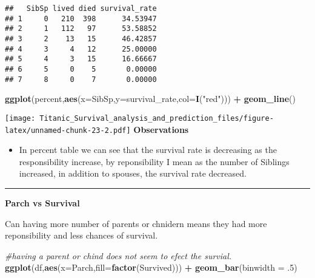 \documentclass[]{article}
\newenvironment{Shaded}{\begin{snugshade}}{\end{snugshade}}
\newcommand{\KeywordTok}[1]{\textcolor[rgb]{0.13,0.29,0.53}{\textbf{#1}}}
\newcommand{\DataTypeTok}[1]{\textcolor[rgb]{0.13,0.29,0.53}{#1}}
\newcommand{\DecValTok}[1]{\textcolor[rgb]{0.00,0.00,0.81}{#1}}
\newcommand{\StringTok}[1]{\textcolor[rgb]{0.31,0.60,0.02}{#1}}
\newcommand{\CommentTok}[1]{\textcolor[rgb]{0.56,0.35,0.01}{\textit{#1}}}
\newcommand{\OperatorTok}[1]{\textcolor[rgb]{0.81,0.36,0.00}{\textbf{#1}}}
\newcommand{\NormalTok}[1]{#1}
\providecommand{\tightlist}{%
  \setlength{\itemsep}{0pt}\setlength{\parskip}{0pt}}
\begin{document}
\begin{verbatim}
##   SibSp lived died survival_rate
## 1     0   210  398      34.53947
## 2     1   112   97      53.58852
## 3     2    13   15      46.42857
## 4     3     4   12      25.00000
## 5     4     3   15      16.66667
## 6     5     0    5       0.00000
## 7     8     0    7       0.00000
\end{verbatim}

\begin{Shaded}
\begin{Highlighting}[]
\KeywordTok{ggplot}\NormalTok{(percent,}\KeywordTok{aes}\NormalTok{(}\DataTypeTok{x=}\NormalTok{SibSp,}\DataTypeTok{y=}\NormalTok{survival_rate,}\DataTypeTok{col=}\KeywordTok{I}\NormalTok{(}\StringTok{"red"}\NormalTok{))) }\OperatorTok{+}\StringTok{ }\KeywordTok{geom_line}\NormalTok{()}
\end{Highlighting}
\end{Shaded}

\texttt{[image: Titanic\_Survival\_analysis\_and\_prediction\_files/figure-latex/unnamed-chunk-23-2.pdf]}
\textbf{Observations}

\begin{itemize}
\tightlist
\item
  In percent table we can see that the survival rate is decreasing as
  the responsibility increase, by reponsibility I mean as the number of
  Siblings increased, in addition to spouses, the survival rate
  decreased.
\end{itemize}

\begin{center}\rule{0.5\linewidth}{\linethickness}\end{center}

\textbf{Parch vs Survival}

Can having more number of parents or chnidern means they had more
reponsibility and less chances of survival.

\begin{Shaded}
\begin{Highlighting}[]
\CommentTok{#having a parent or chind does not seem to efect the survial.}
\KeywordTok{ggplot}\NormalTok{(df,}\KeywordTok{aes}\NormalTok{(}\DataTypeTok{x=}\NormalTok{Parch,}\DataTypeTok{fill=}\KeywordTok{factor}\NormalTok{(Survived))) }\OperatorTok{+}\StringTok{ }\KeywordTok{geom_bar}\NormalTok{(}\DataTypeTok{binwidth =}\NormalTok{ .}\DecValTok{5}\NormalTok{)}
\end{Highlighting}
\end{Shaded}
\end{document}
